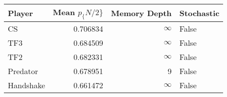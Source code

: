 \begin{tabular}{lrrl}
\toprule
    Player &  Mean $p_\{N/2\}$ &  Memory Depth & Stochastic \\
\midrule
        CS &        0.706834 &            \(\infty\) &      False \\
       TF3 &        0.684509 &            \(\infty\) &      False \\
       TF2 &        0.682331 &            \(\infty\) &      False \\
  Predator &        0.678951 &             9 &      False \\
 Handshake &        0.661472 &            \(\infty\) &      False \\
\bottomrule
\end{tabular}
